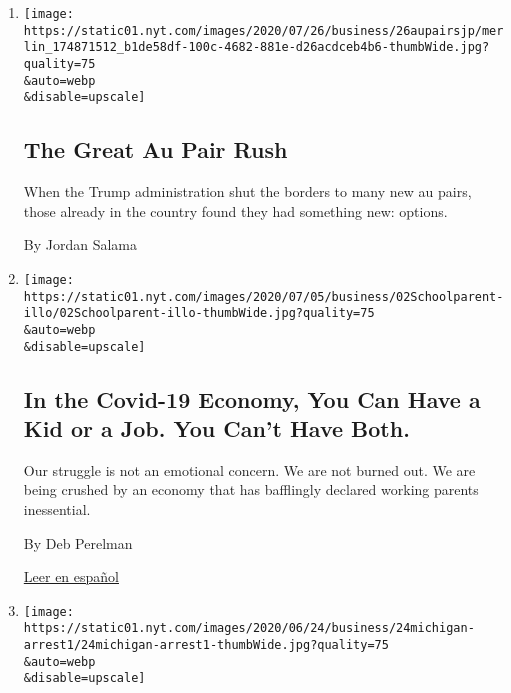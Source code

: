 \begin{enumerate}
\def\labelenumi{\arabic{enumi}.}
\item
  \href{/2020/07/25/business/the-great-au-pair-rush.html}{}

  \texttt{[image: https://static01.nyt.com/images/2020/07/26/business/26aupairsjp/merlin\_174871512\_b1de58df-100c-4682-881e-d26acdceb4b6-thumbWide.jpg?quality=75\\\&auto=webp\\\&disable=upscale]}

  \hypertarget{the-great-au-pair-rush}{%
  \subsection{The Great Au Pair Rush}\label{the-great-au-pair-rush}}

  When the Trump administration shut the borders to many new au pairs,
  those already in the country found they had something new: options.

  By Jordan Salama
\item
  \href{/2020/07/02/business/covid-economy-parents-kids-career-homeschooling.html}{}

  \texttt{[image: https://static01.nyt.com/images/2020/07/05/business/02Schoolparent-illo/02Schoolparent-illo-thumbWide.jpg?quality=75\\\&auto=webp\\\&disable=upscale]}

  \hypertarget{in-the-covid-19-economy-you-can-have-a-kid-or-a-job-you-cant-have-both}{%
  \subsection{In the Covid-19 Economy, You Can Have a Kid or a Job. You
  Can't Have
  Both.}\label{in-the-covid-19-economy-you-can-have-a-kid-or-a-job-you-cant-have-both}}

  Our struggle is not an emotional concern. We are not burned out. We
  are being crushed by an economy that has bafflingly declared working
  parents inessential.

  By Deb Perelman

  \href{https://www.nytimes.com/es/2020/07/09/espanol/estilos-de-vida/trabajo-hijos-coronavirus.html}{Leer
  en español}
\item
  \href{/2020/06/24/technology/facial-recognition-arrest.html}{}

  \texttt{[image: https://static01.nyt.com/images/2020/06/24/business/24michigan-arrest1/24michigan-arrest1-thumbWide.jpg?quality=75\\\&auto=webp\\\&disable=upscale]}

  \hypertarget{wrongfully-accused-by-an-algorithm}{%
}
\end{enumerate}
